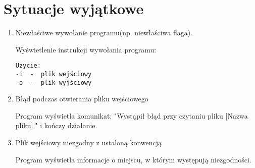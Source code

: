 \documentclass[a4paper,12pt,twoside]{article}
\begin{document}
\section{Sytuacje wyjątkowe}
\begin{enumerate}
\item Niewłaściwe wywołanie programu(np. niewłaściwa flaga).
\par Wyświetlenie instrukcji wywołania programu:
\begin{verbatim}
Użycie:
-i  -  plik wejściowy
-o  -  plik wyjściowy
\end{verbatim}
\item Błąd podczas otwierania pliku wejściowego
\par Program wyświetla komunikat: "Wystąpił błąd przy czytaniu pliku [Nazwa pliku]." i kończy działanie.
\item Plik wejściowy niezgodny z ustaloną konwencją
\par Program wyświetla informacje o miejscu, w którym występują niezgodności.
\end{enumerate}
\end{document}
